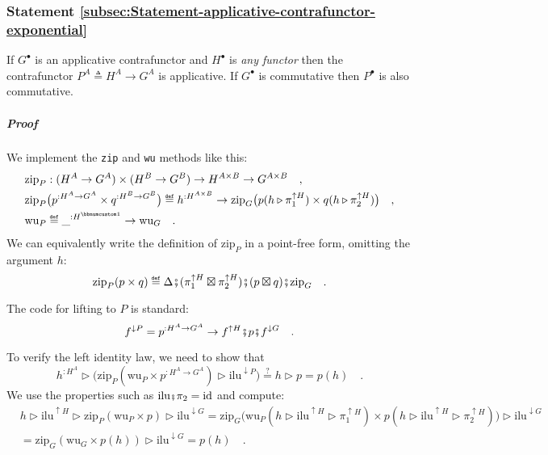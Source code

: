 \subsubsection{Statement \label{subsec:Statement-applicative-contrafunctor-exponential}\ref{subsec:Statement-applicative-contrafunctor-exponential}}

If $G^{\bullet}$ is an applicative contrafunctor and $H^{\bullet}$
is \emph{any functor} then the contrafunctor $P^{A}\triangleq H^{A}\rightarrow G^{A}$
is applicative. If $G^{\bullet}$ is commutative then $P^{\bullet}$
is also commutative.

\subparagraph{Proof}

We implement the \lstinline!zip! and \lstinline!wu! methods like
this:
\begin{align*}
 & \text{zip}_{P}:(H^{A}\rightarrow G^{A})\times(H^{B}\rightarrow G^{B})\rightarrow H^{A\times B}\rightarrow G^{A\times B}\quad,\\
 & \text{zip}_{P}\big(p^{:H^{A}\rightarrow G^{A}}\times q^{:H^{B}\rightarrow G^{B}}\big)\triangleq h^{:H^{A\times B}}\rightarrow\text{zip}_{G}\big(p(h\triangleright\pi_{1}^{\uparrow H})\times q(h\triangleright\pi_{2}^{\uparrow H})\big)\quad,\\
 & \text{wu}_{P}\triangleq\_^{:H^{\bbnum 1}}\rightarrow\text{wu}_{G}\quad.
\end{align*}
We can equivalently write the definition of $\text{zip}_{P}$ in a
point-free form, omitting the argument $h$:
\[
\text{zip}_{P}(p\times q)\triangleq\Delta\bef(\pi_{1}^{\uparrow H}\boxtimes\pi_{2}^{\uparrow H})\bef(p\boxtimes q)\bef\text{zip}_{G}\quad.
\]

The code for lifting to $P$ is standard:
\[
f^{\downarrow P}=p^{:H^{A}\rightarrow G^{A}}\rightarrow f^{\uparrow H}\bef p\bef f^{\downarrow G}\quad.
\]

To verify the left identity law, we need to show that
\[
h^{:H^{A}}\triangleright\big(\text{zip}_{P}(\text{wu}_{P}\times p^{:H^{A}\rightarrow G^{A}})\triangleright\text{ilu}^{\downarrow P}\big)\overset{?}{=}h\triangleright p=p(h)\quad.
\]
We use the properties such as $\text{ilu}\bef\pi_{2}=\text{id}$ and
compute:
\begin{align*}
 & h\triangleright\text{ilu}^{\uparrow H}\triangleright\text{zip}_{P}(\text{wu}_{P}\times p)\triangleright\text{ilu}^{\downarrow G}=\text{zip}_{G}\big(\text{wu}_{P}(h\triangleright\text{ilu}^{\uparrow H}\triangleright\pi_{1}^{\uparrow H})\times p(h\triangleright\text{ilu}^{\uparrow H}\triangleright\pi_{2}^{\uparrow H})\big)\triangleright\text{ilu}^{\downarrow G}\\
 & =\text{zip}_{G}(\text{wu}_{G}\times p(h))\triangleright\text{ilu}^{\downarrow G}=p(h)\quad.
\end{align*}

